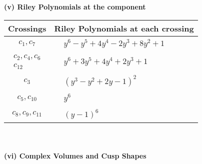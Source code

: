 \documentclass[1p]{elsarticle_modified}
\theoremstyle{definition}
\begin{document}
\newpage\renewcommand{\arraystretch}{1}
\flushleft \textbf{(v) Riley Polynomials at the component}\newline \\
\begin{tabular}{m{50pt}|m{274pt}}
Crossings & \hspace{64pt}Riley Polynomials at each crossing \\
\hline $$\begin{aligned}c_{1},c_{7}\end{aligned}$$&$\begin{aligned}
&y^6- y^5+4 y^4-2 y^3+8 y^2+1
\end{aligned}$\\
\hline $$\begin{aligned}c_{2},c_{4},c_{6}\\c_{12}\end{aligned}$$&$\begin{aligned}
&y^6+3 y^5+4 y^4+2 y^3+1
\end{aligned}$\\
\hline $$\begin{aligned}c_{3}\end{aligned}$$&$\begin{aligned}
&(y^3- y^2+2 y-1)^2
\end{aligned}$\\
\hline $$\begin{aligned}c_{5},c_{10}\end{aligned}$$&$\begin{aligned}
&y^6
\end{aligned}$\\
\hline $$\begin{aligned}c_{8},c_{9},c_{11}\end{aligned}$$&$\begin{aligned}
&(y-1)^6
\end{aligned}$\\
\hline
\end{tabular}\\~\\
\newpage\flushleft \textbf{(vi) Complex Volumes and Cusp Shapes}
\end{document}
